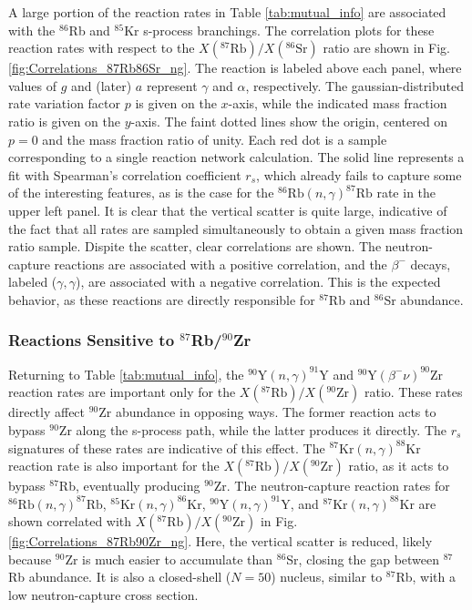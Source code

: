 A large portion of the reaction rates in Table \ref{tab:mutual_info} are associated with the $^{86}$Rb and $^{85}$Kr s-process branchings. The correlation plots for these reaction rates with respect to the $X(^{87}\mathrm{Rb})/X(^{86}\mathrm{Sr})$ ratio are shown in Fig. \ref{fig:Correlations_87Rb86Sr_ng}. The reaction is labeled above each panel, where values of $g$ and (later) $a$ represent $\gamma$ and $\alpha$, respectively. The gaussian-distributed rate variation factor $p$ is given on the $x$-axis, while the indicated mass fraction ratio is given on the $y$-axis. The faint dotted lines show the origin, centered on $p=0$ and the mass fraction ratio of unity. Each red dot is a sample corresponding to a single reaction network calculation. The solid line represents a fit with Spearman's correlation coefficient $r_{s}$, which already fails to capture some of the interesting features, as is the case for the $^{86}\mathrm{Rb}(n,\gamma)^{87}\mathrm{Rb}$ rate in the upper left panel. It is clear that the vertical scatter is quite large, indicative of the fact that all rates are sampled simultaneously to obtain a given mass fraction ratio sample. Dispite the scatter, clear correlations are shown. The neutron-capture reactions are associated with a positive correlation, and the $\beta^{-}$ decays, labeled ($\gamma,\gamma$), are associated with a negative correlation. This is the expected behavior, as these reactions are directly responsible for $^{87}$Rb and $^{86}$Sr abundance.

\subsubsection{Reactions Sensitive to $^{87}$Rb/$^{90}$Zr}

Returning to Table \ref{tab:mutual_info}, the $^{90}\mathrm{Y}(n,\gamma)^{91}\mathrm{Y}$ and $^{90}\mathrm{Y}(\beta^{-}\nu)^{90}\mathrm{Zr}$ reaction rates are important only for the $X(^{87}\mathrm{Rb})/X(^{90}\mathrm{Zr})$ ratio. These rates directly affect $^{90}$Zr abundance in opposing ways. The former reaction acts to bypass $^{90}$Zr along the s-process path, while the latter produces it directly. The $r_{s}$ signatures of these rates are indicative of this effect. The $^{87}\mathrm{Kr}(n,\gamma)^{88}\mathrm{Kr}$ reaction rate is also important for the $X(^{87}\mathrm{Rb})/X(^{90}\mathrm{Zr})$ ratio, as it acts to bypass $^{87}$Rb, eventually producing $^{90}$Zr. The neutron-capture reaction rates for $^{86}\mathrm{Rb}(n,\gamma)^{87}\mathrm{Rb}$, $^{85}\mathrm{Kr}(n,\gamma)^{86}\mathrm{Kr}$, $^{90}\mathrm{Y}(n,\gamma)^{91}\mathrm{Y}$, and $^{87}\mathrm{Kr}(n,\gamma)^{88}\mathrm{Kr}$ are shown correlated with $X(^{87}\mathrm{Rb})/X(^{90}\mathrm{Zr})$ in Fig. \ref{fig:Correlations_87Rb90Zr_ng}. Here, the vertical scatter is reduced, likely because $^{90}$Zr is much easier to accumulate than $^{86}$Sr, closing the gap between $^{87}$Rb abundance. It is also a closed-shell ($N=50$) nucleus, similar to $^{87}$Rb, with a low neutron-capture cross section.

